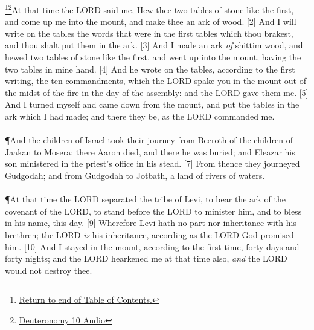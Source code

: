 \footnote{\textcolor[cmyk]{0.99998,1,0,0}{\hyperlink{TOC}{Return to end of Table of Contents.}}}\footnote{\href{https://audiobible.com/bible/deuteronomy_10.html}{\textcolor[cmyk]{0.99998,1,0,0}{Deuteronomy 10 Audio}}}\textcolor[cmyk]{0.99998,1,0,0}{At that time the LORD said  me, Hew thee two tables of stone like  the first, and come up  me into the mount, and make thee an ark of wood.}
[2] \textcolor[cmyk]{0.99998,1,0,0}{And I will write on the tables the words that were in the first tables which thou brakest, and thou shalt put them in the ark.}
[3] \textcolor[cmyk]{0.99998,1,0,0}{And I made an ark \emph{of} shittim wood, and hewed two tables of stone like  the first, and went up into the mount, having the two tables in mine hand.}
[4] \textcolor[cmyk]{0.99998,1,0,0}{And he wrote on the tables, according to the first writing, the ten commandments, which the LORD spake  you in the mount out of the midst of the fire in the day of the assembly: and the LORD gave them  me.}
[5] \textcolor[cmyk]{0.99998,1,0,0}{And I turned myself and came down from the mount, and put the tables in the ark which I had made; and there they be, as the LORD commanded me.}\\
\\
\P \textcolor[cmyk]{0.99998,1,0,0}{And the children of Israel took their journey from Beeroth of the children of Jaakan to Mosera: there Aaron died, and there he was buried; and Eleazar his son ministered in the priest's office in his stead.}
[7] \textcolor[cmyk]{0.99998,1,0,0}{From thence they journeyed  Gudgodah; and from Gudgodah to Jotbath, a land of rivers of waters.}\\
\\
\P \textcolor[cmyk]{0.99998,1,0,0}{At that time the LORD separated the tribe of Levi, to bear the ark of the covenant of the LORD, to stand before the LORD to minister  him, and to bless in his name,  this day.}
[9] \textcolor[cmyk]{0.99998,1,0,0}{Wherefore Levi hath no part nor inheritance with his brethren; the LORD \emph{is} his inheritance, according as the LORD  God promised him.}
[10] \textcolor[cmyk]{0.99998,1,0,0}{And I stayed in the mount, according to the first time, forty days and forty nights; and the LORD hearkened  me at that time also, \emph{and} the LORD would not destroy thee.}
